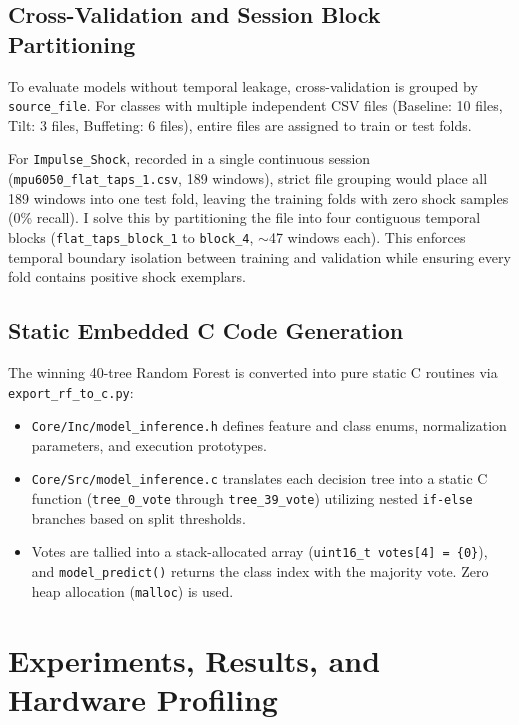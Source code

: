 \documentclass[twocolumn]{article}
\begin{document}
\subsection{Cross-Validation and Session Block Partitioning}
To evaluate models without temporal leakage, cross-validation is grouped by \texttt{source\_file}. For classes with multiple independent CSV files (Baseline: 10 files, Tilt: 3 files, Buffeting: 6 files), entire files are assigned to train or test folds.

For \texttt{Impulse\_Shock}, recorded in a single continuous session (\texttt{mpu6050\_flat\_taps\_1.csv}, 189 windows), strict file grouping would place all 189 windows into one test fold, leaving the training folds with zero shock samples (0\% recall). I solve this by partitioning the file into four contiguous temporal blocks (\texttt{flat\_taps\_block\_1} to \texttt{block\_4}, $\sim$47 windows each). This enforces temporal boundary isolation between training and validation while ensuring every fold contains positive shock exemplars.

\subsection{Static Embedded C Code Generation}
The winning 40-tree Random Forest is converted into pure static C routines via \texttt{export\_rf\_to_c.py}:
\begin{itemize}[noitemsep]
    \item \texttt{Core/Inc/model\_inference.h} defines feature and class enums, normalization parameters, and execution prototypes.
    \item \texttt{Core/Src/model\_inference.c} translates each decision tree into a static C function (\texttt{tree\_0\_vote} through \texttt{tree\_39\_vote}) utilizing nested \texttt{if-else} branches based on split thresholds.
    \item Votes are tallied into a stack-allocated array (\texttt{uint16\_t votes[4] = \{0\}}), and \texttt{model\_predict()} returns the class index with the majority vote. Zero heap allocation (\texttt{malloc}) is used.
\end{itemize}

\section{Experiments, Results, and Hardware Profiling}
\end{document}
